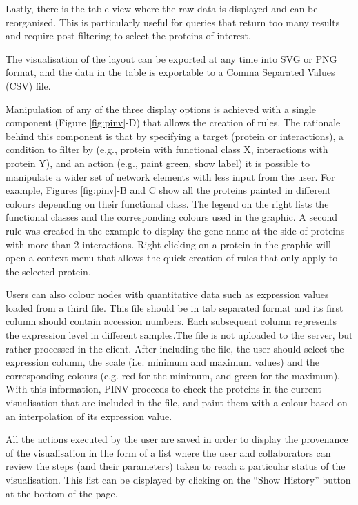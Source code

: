 Lastly, there is the table view where the raw data is displayed and can be reorganised. This is particularly useful for queries that return too many results and require post-filtering to select the proteins of interest.

The visualisation of the layout can be exported at any time into SVG or PNG format, and the data in the table is exportable to a Comma Separated Values (CSV) file.

Manipulation of any of the three display options is achieved with a single component (Figure \ref{fig:pinv}-D) that allows the creation of rules. The rationale behind this component is that by specifying a target (protein or interactions), a condition to filter by (e.g., protein with functional class X, interactions with protein Y), and an action (e.g., paint green, show label) it is possible to manipulate a wider set of network elements with less input from the user. For example, Figures \ref{fig:pinv}-B and C show all the proteins painted in different colours depending on their functional class. The legend on the right lists the functional classes and the corresponding colours used in the graphic. A second rule was created in the example to display the gene name at the side of proteins with more than 2 interactions. Right clicking on a protein in the graphic will open a context menu that allows the quick creation of rules that only apply to the selected protein. 

Users can also colour nodes with quantitative data such as expression values loaded from a third file. This file should be in tab separated format and its first column should contain accession numbers. Each subsequent column represents the expression level in different samples.The file is not uploaded to the server, but rather processed in the client. After including the file, the user should select the expression column, the scale (i.e. minimum and maximum values) and the corresponding colours (e.g. red for the minimum, and green for the maximum). With this information, PINV proceeds to check the proteins in the current visualisation that are included in the file, and paint them with a colour based on an interpolation of its expression value.

All the actions executed by the user are saved in order to display the provenance of the visualisation in the form of a list where the user and collaborators can review the steps (and their parameters) taken to reach a particular status of the visualisation. This list can be displayed by clicking on the “Show History” button at the bottom of the page. 

